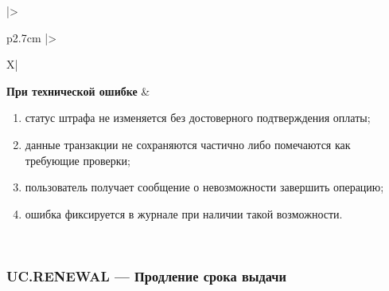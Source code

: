 \documentclass[12pt,a4paper]{article}
\begin{document}
\begin{xltabular}{\textwidth}{
				|>{\raggedright\arraybackslash}p{2.7cm}
				|>{\raggedright\arraybackslash}X|
			}
			\textbf{При технической ошибке} &
			\begin{enumerate}
				\item статус штрафа не изменяется без достоверного подтверждения
				оплаты;
				\item данные транзакции не сохраняются частично либо помечаются как
				требующие проверки;
				\item пользователь получает сообщение о невозможности завершить
				операцию;
				\item ошибка фиксируется в журнале при наличии такой возможности.
			\end{enumerate} \\
			\hline
			
		\end{xltabular}
		
		\label{tab:uc-fine-payment-specification}
		
		\clearpage
		
		\subsubsection{UC.RENEWAL --- Продление срока выдачи}
		
\end{document}
